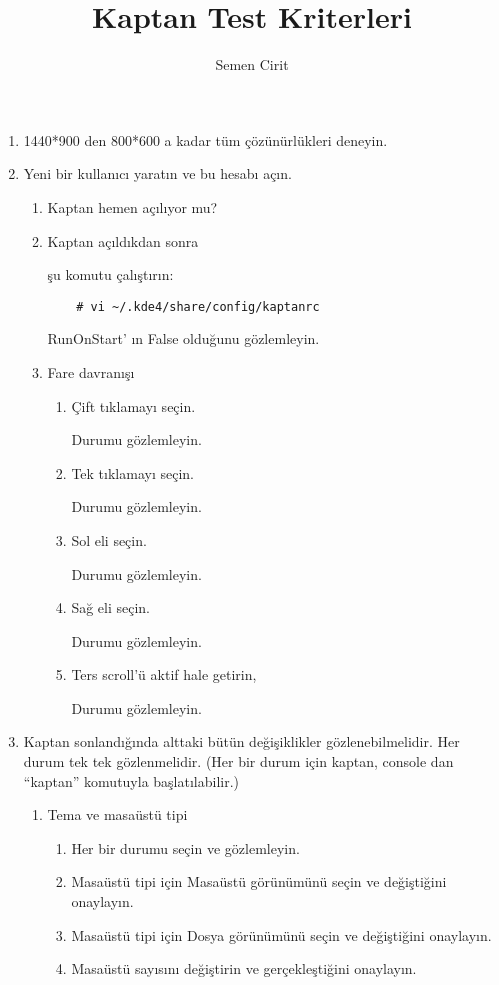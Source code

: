 \documentclass[a4paper,10pt]{article}
\title{Kaptan Test Kriterleri}
\author{Semen Cirit}
\begin{document}
\maketitle

\begin{enumerate}

\item 1440*900 den 800*600 a kadar tüm çözünürlükleri deneyin.

\item Yeni bir kullanıcı yaratın ve bu hesabı açın.
\begin{enumerate}
    \item Kaptan hemen açılıyor mu?
    \item Kaptan açıldıkdan sonra

          şu komutu çalıştırın:
\begin{verbatim}
    # vi ~/.kde4/share/config/kaptanrc
\end{verbatim} 
        RunOnStart' ın False olduğunu gözlemleyin.

    \item Fare davranışı
    \begin{enumerate}
        \item Çift tıklamayı seçin.

            Durumu gözlemleyin.
        \item Tek tıklamayı seçin.

            Durumu gözlemleyin.

        \item Sol eli seçin.

            Durumu gözlemleyin.
        \item Sağ eli seçin.

            Durumu gözlemleyin.

        \item Ters scroll'ü aktif hale getirin,

            Durumu gözlemleyin.
    \end{enumerate}
\end{enumerate}

\item Kaptan sonlandığında alttaki bütün değişiklikler gözlenebilmelidir. Her durum tek tek gözlenmelidir.
(Her bir durum için kaptan, console dan ``kaptan'' komutuyla başlatılabilir.)
    \begin{enumerate}
    \item Tema ve masaüstü tipi
        \begin{enumerate}
        \item Her bir durumu seçin ve gözlemleyin.
        \item Masaüstü tipi için Masaüstü görünümünü seçin ve değiştiğini onaylayın.
        \item Masaüstü tipi için Dosya görünümünü seçin ve değiştiğini onaylayın.
        \item Masaüstü sayısını değiştirin ve gerçekleştiğini onaylayın.
        \end{enumerate}


\end{enumerate}
\end{enumerate}
\end{document}
